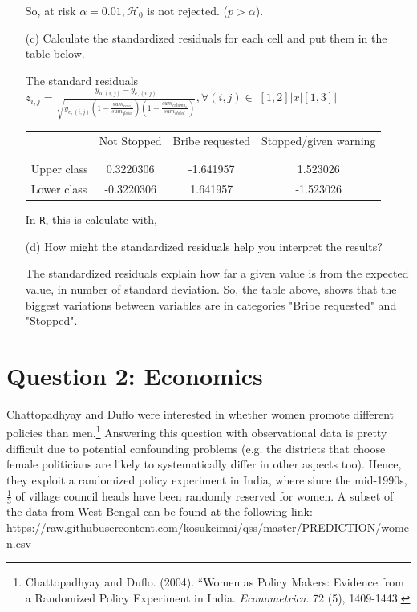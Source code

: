 \documentclass[12pt,letterpaper]{article}
\begin{document}
\begin{enumerate}
	So, at risk $\alpha=0.01, \mathcal{H}_0$ is not rejected. ($p>\alpha$).

	\newpage
	\item [(c)] Calculate the standardized residuals for each cell and put them in the table below.
	\vspace{1cm}

	The standard residuals $z_{i,j}=\frac{y_{o, (i,j)}-y_{e, (i,j)}}{\sqrt{ y_{e, (i,j)} (1- \frac{ sum_{raw_i}}{sum_{global}})(1- \frac{ sum_{column_j}}{sum_{global}}{})  }} , \forall (i,j) \in |[1,2]|x|[1,3]|$

	\begin{table}[h]
		\centering
		\begin{tabular}{l | c c c }
			& Not Stopped & Bribe requested & Stopped/given warning \\
			\\[-1.8ex] 
			\hline \\[-1.8ex]
			Upper class  & 0.3220306 &-1.641957 &  1.523026 \\
			Lower class & -0.3220306&  1.641957 &-1.523026 \\
			
		\end{tabular}
	\end{table}
	
	In  \texttt{R}, this is calculate with, 
	  
		

	\item [(d)] How might the standardized residuals help you interpret the results?  

	The standardized residuals explain how far a given value is from the expected value, in number of standard deviation. So, the table above, shows that the biggest variations between variables are in categories "Bribe requested" and "Stopped".

\end{enumerate}

\section*{Question 2: Economics}
Chattopadhyay and Duflo were interested in whether women promote different policies than men.\footnote{Chattopadhyay and Duflo. (2004). ``Women as Policy Makers: Evidence from a Randomized Policy Experiment in India. \textit{Econometrica}. 72 (5), 1409-1443.} Answering this question with observational data is pretty difficult due to potential confounding problems (e.g. the districts that choose female politicians are likely to systematically differ in other aspects too). Hence, they exploit a randomized policy experiment in India, where since the mid-1990s, $\frac{1}{3}$ of village council heads have been randomly reserved for women. A subset of the data from West Bengal can be found at the following link: \url{https://raw.githubusercontent.com/kosukeimai/qss/master/PREDICTION/women.csv}\\
\end{document}

